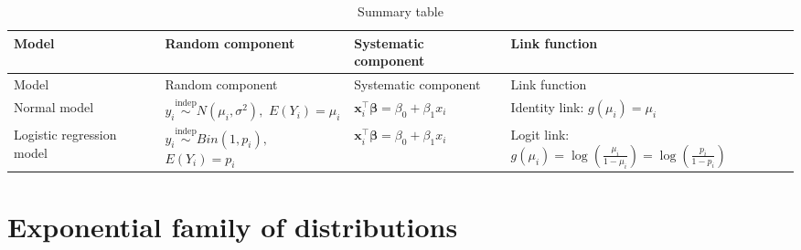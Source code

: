 \documentclass[
  a4paper,
  DIV=11,
  numbers=noendperiod]{scrreprt}
\begin{document}
\begin{longtable}[]{@{}
  >{\raggedright\arraybackslash}p{}
  >{\raggedright\arraybackslash}p{}
  >{\raggedright\arraybackslash}p{}
  >{\raggedright\arraybackslash}p{}@{}}
\caption{Summary table}\tabularnewline
\toprule\noalign{}
\begin{minipage}[b]{\linewidth}\raggedright
Model
\end{minipage} & \begin{minipage}[b]{\linewidth}\raggedright
Random component
\end{minipage} & \begin{minipage}[b]{\linewidth}\raggedright
Systematic component
\end{minipage} & \begin{minipage}[b]{\linewidth}\raggedright
Link function
\end{minipage} \\
\midrule\noalign{}
\endfirsthead
\toprule\noalign{}
\begin{minipage}[b]{\linewidth}\raggedright
Model
\end{minipage} & \begin{minipage}[b]{\linewidth}\raggedright
Random component
\end{minipage} & \begin{minipage}[b]{\linewidth}\raggedright
Systematic component
\end{minipage} & \begin{minipage}[b]{\linewidth}\raggedright
Link function
\end{minipage} \\
\midrule\noalign{}
\endhead
\bottomrule\noalign{}
\endlastfoot
Normal model & \(y_i \overset{\text{indep}}{\sim} N(\mu_i, \sigma^2),\)
\(E(Y_i) = \mu_i\) &
\(\boldsymbol{x}_i^{\intercal} \boldsymbol{\beta} = \beta_0 + \beta_1 x_i\)
& Identity link: \(g(\mu_i) = \mu_i\) \\
Logistic regression model &
\(y_i \overset{\text{indep}}{\sim} Bin(1, p_i),\) \(E(Y_i) = p_i\) &
\(\boldsymbol{x}_i^{\intercal} \boldsymbol{\beta} = \beta_0 + \beta_1 x_i\)
& Logit link:
\(g(\mu_i) = \log \left(\frac{\mu_i}{1-\mu_i}\right) = \log \left(\frac{p_i}{1-p_i}\right)\) \\
\end{longtable}

\section{Exponential family of
distributions}\label{exponential-family-of-distributions}
\end{document}

